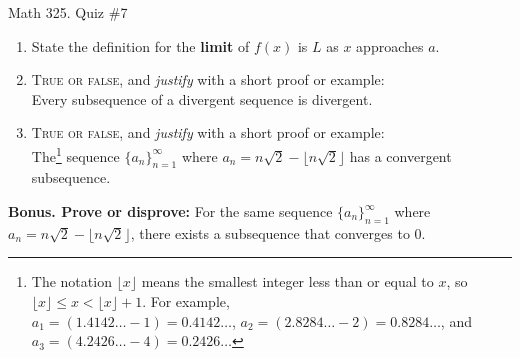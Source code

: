 \documentclass[12pt]{amsart}
\begin{document}
	
	\thispagestyle{empty}
	
	\begin{center}
		\Large{Math 325. Quiz \#7 }\\

	\end{center}
	
	
	
	\bigskip
	
	\begin{enumerate}
	
	\item State the definition for the \textbf{limit} of $f(x)$ is $L$ as $x$ approaches $a$. 
	
		
	\vfill\vfill
	
\item  \textsc{True or false}, and \emph{justify} with a short proof or example:\\
Every subsequence of a divergent sequence is divergent.

\vfill\vfill\vfill
	
		\item  \textsc{True or false}, and \emph{justify} with a short proof or example:\\
	The\footnote{The notation $\lfloor x \rfloor$ means the smallest integer less than or equal to $x$, so $\lfloor x \rfloor \leq x < \lfloor x \rfloor +1$. For example, \\ $a_1 = (1.4142\ldots - 1) = 0.4142\dots$, $a_2= (2.8284\ldots - 2)= 0.8284\ldots$, and ${a_3=(4.2426\ldots - 4) =0.2426\ldots}$} sequence $\{a_n\}_{n=1}^\infty$ where  $a_n =  n \sqrt{2} - \lfloor n \sqrt{2} \rfloor$ has a convergent subsequence.

	

\vfill\vfill\vfill
















\end{enumerate}

\newpage

\noindent \textbf{Bonus. Prove or disprove:}
For the same sequence $\{a_n\}_{n=1}^\infty$ where  $a_n =  n \sqrt{2} - \lfloor n \sqrt{2} \rfloor$, there exists a subsequence that converges to $0$.
	
	
\end{document}

